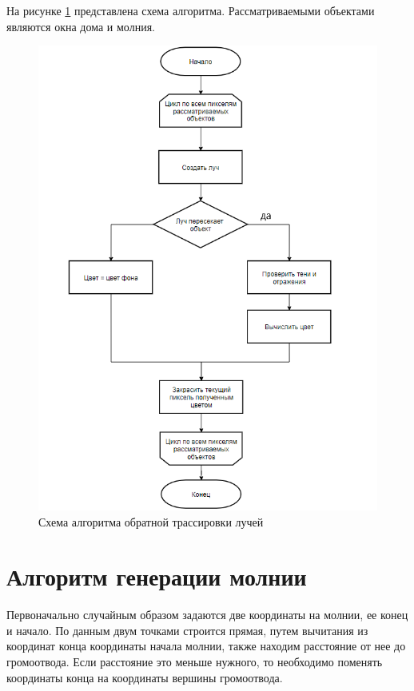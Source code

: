 На рисунке \ref{img:trac} представлена схема алгоритма. Рассматриваемыми объектами являются окна дома и молния.

\begin{figure}[H]
	\begin{center}
		\includegraphics[scale=0.88]{img/trac.png}
	\end{center}
	\captionsetup{justification=centering}
	\caption{Схема алгоритма обратной трассировки лучей }
	\label{img:trac}
\end{figure}

\section{Алгоритм генерации молнии}
Первоначально случайным образом задаются две координаты на молнии, ее конец и начало. По данным двум точками строится прямая, путем вычитания из координат конца координаты начала молнии, также находим расстояние от нее до громоотвода. Если расстояние это меньше нужного, то необходимо поменять координаты конца на координаты вершины громоотвода.


